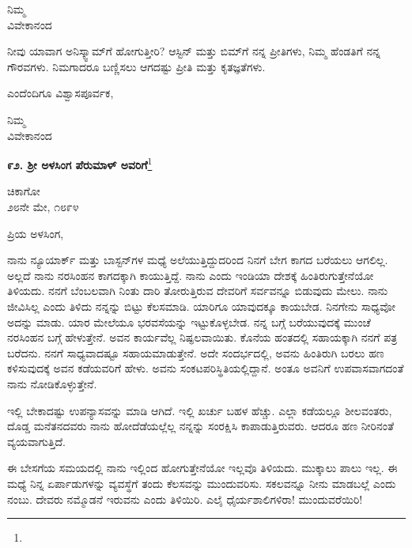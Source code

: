\vspace{-0.3cm}

{\flushright
ನಿಮ್ಮ\\ವಿವೇಕಾನಂದ\par}

\vspace{0.2cm}

ನೀವು ಯಾವಾಗ ಅನಿಸ್ಕ್ವಾಮ್‌ಗೆ ಹೋಗುತ್ತೀರಿ? ಆಸ್ಟಿನ್ ಮತ್ತು ಬಿಮ್‌ಗೆ ನನ್ನ ಪ್ರೀತಿಗಳು, ನಿಮ್ಮ ಹೆಂಡತಿಗೆ ನನ್ನ ಗೌರವಗಳು. ನಿಮಗಾದರೂ ಬಣ್ಣಿಸಲು ಆಗದಷ್ಟು ಪ್ರೀತಿ ಮತ್ತು ಕೃತಜ್ಞತೆಗಳು.

ಎಂದೆಂದಿಗೂ ವಿಶ್ವಾಸಪೂರ್ವಕ,

{\flushright
ನಿಮ್ಮ\\ವಿವೇಕಾನಂದ\par}

\newpage

\begin{center}
\textbf{೯೨. ಶ‍್ರೀ ಅಳಸಿಂಗ ಪೆರುಮಾಳ್ ಅವರಿಗೆ}\footnote{}
\end{center}

\begin{flushright}
ಚಿಕಾಗೋ\\೨೮ನೇ ಮೇ, ೧೮೯೪
\end{flushright}

ಪ್ರಿಯ ಅಳಸಿಂಗ,

ನಾನು ನ್ಯೂಯಾರ್ಕ್ ಮತ್ತು ಬಾಸ್ಟನ್‌ಗಳ ಮಧ್ಯೆ ಅಲೆಯುತ್ತಿದ್ದುದರಿಂದ ನಿನಗೆ ಬೇಗ ಕಾಗದ ಬರೆಯಲು ಆಗಲಿಲ್ಲ. ಅಲ್ಲದೆ ನಾನು ನರಸಿಂಹನ ಕಾಗದಕ್ಕಾಗಿ ಕಾಯುತ್ತಿದ್ದೆ. ನಾನು ಎಂದು ಇಂಡಿಯಾ ದೇಶಕ್ಕೆ ಹಿಂತಿರುಗುತ್ತೇನೆಯೋ ತಿಳಿಯದು. ನನಗೆ ಬೆಂಬಲವಾಗಿ ನಿಂತು ದಾರಿ ತೋರುತ್ತಿರುವ ದೇವರಿಗೆ ಸರ್ವವನ್ನೂ ಬಿಡುವುದು ಮೇಲು. ನಾನು ಜೀವಿಸಿಲ್ಲ ಎಂದು ತಿಳಿದು ನನ್ನನ್ನು ಬಿಟ್ಟು ಕೆಲಸಮಾಡಿ. ಯಾರಿಗೂ ಯಾವುದಕ್ಕೂ ಕಾಯಬೇಡ. ನಿನಗೇನು ಸಾಧ್ಯವೋ ಅದನ್ನು ಮಾಡು. ಯಾರ ಮೇಲೆಯೂ ಭರವಸೆಯನ್ನು ಇಟ್ಟುಕೊಳ್ಳಬೇಡ. ನನ್ನ ಬಗ್ಗೆ ಬರೆಯುವುದಕ್ಕೆ ಮುಂಚೆ ನರಸಿಂಹನ ಬಗ್ಗೆ ಹೇಳುತ್ತೇನೆ. ಅವನ ಕಾರ್ಯವೆಲ್ಲ ನಿಷ್ಫಲವಾಯಿತು. ಕೊನೆಯ ಹಂತದಲ್ಲಿ ಸಹಾಯಕ್ಕಾಗಿ ನನಗೆ ಪತ್ರ ಬರೆದನು. ನನಗೆ ಸಾಧ್ಯವಾದಷ್ಟೂ ಸಹಾಯಮಾಡುತ್ತೇನೆ. ಅದೇ ಸಂದರ್ಭದಲ್ಲಿ, ಅವನು ಹಿಂತಿರುಗಿ ಬರಲು ಹಣ ಕಳಿಸುವುದಕ್ಕೆ ಅವನ ಕಡೆಯವರಿಗೆ ಹೇಳು. ಅವನು ಸಂಕಟಪರಿಸ್ಥಿತಿಯಲ್ಲಿದ್ದಾನೆ. ಅಂತೂ ಅವನಿಗೆ ಉಪವಾಸವಾಗದಂತೆ ನಾನು ನೋಡಿಕೊಳ್ಳುತ್ತೇನೆ.

ಇಲ್ಲಿ ಬೇಕಾದಷ್ಟು ಉಪನ್ಯಾಸವನ್ನು ಮಾಡಿ ಆಗಿದೆ. ಇಲ್ಲಿ ಖರ್ಚು ಬಹಳ ಹೆಚ್ಚು. ಎಲ್ಲಾ ಕಡೆಯಲ್ಲೂ ಶೀಲವಂತರು, ದೊಡ್ಡ ಮನೆತನದವರು ನಾನು ಹೋದೆಡೆಯಲ್ಲೆಲ್ಲ ನನ್ನನ್ನು ಸಂರಕ್ಷಿಸಿ ಕಾಪಾಡುತ್ತಿರುವರು. ಆದರೂ ಹಣ ನೀರಿನಂತೆ ವ್ಯಯವಾಗುತ್ತಿದೆ.

ಈ ಬೇಸಗೆಯ ಸಮಯದಲ್ಲಿ ನಾನು ಇಲ್ಲಿಂದ ಹೋಗುತ್ತೇನೆಯೋ ಇಲ್ಲವೊ ತಿಳಿ\-ಯದು. ಮುಕ್ಕಾಲು ಪಾಲು ಇಲ್ಲ. ಈ ಮಧ್ಯೆ ನಿನ್ನ ಏರ್ಪಾಡುಗಳನ್ನು ವ್ಯವಸ್ಥೆಗೆ ತಂದು ಕೆಲಸವನ್ನು ಮುಂದುವರಿಸು. ಸಕಲವನ್ನೂ ನೀನು ಮಾಡಬಲ್ಲೆ ಎಂದು ನಂಬು. ದೇವರು ನಮ್ಮೊಡನೆ ಇರುವನು ಎಂದು ತಿಳಿಯಿರಿ. ಎಲೈ ಧೈರ್ಯಶಾಲಿಗಳಿರಾ! ಮುಂದುವರೆಯಿರಿ!


